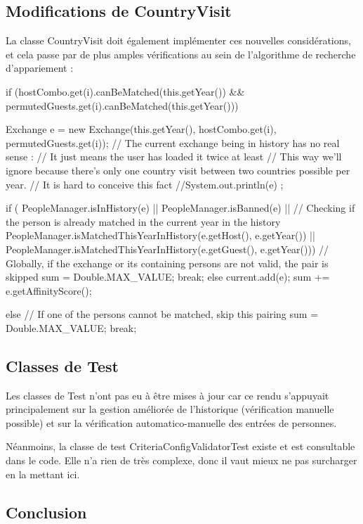 \documentclass{mytex}
\begin{document}
\subsection{Modifications de CountryVisit}

La classe CountryVisit doit également implémenter ces nouvelles considérations, et cela passe par de plus amples vérifications au sein de l'algorithme de recherche d'appariement :

\begin{codebox}
if (hostCombo.get(i).canBeMatched(this.getYear()) && permutedGuests.get(i).canBeMatched(this.getYear())) {
	Exchange e = new Exchange(this.getYear(), hostCombo.get(i), permutedGuests.get(i));
	// The current exchange being in history has no real sense :
	// It just means the user has loaded it twice at least
	// This way we'll ignore because there's only one country visit between two countries possible per year.
	// It is hard to conceive this fact
	//System.out.println(e) ;
	
	if (
	PeopleManager.isInHistory(e) || 
	PeopleManager.isBanned(e) || 
	// Checking if the person is already matched in the current year in the history
	PeopleManager.isMatchedThisYearInHistory(e.getHost(), e.getYear()) ||
	PeopleManager.isMatchedThisYearInHistory(e.getGuest(), e.getYear())) {
		// Globally, if the exchange or its containing persons are not valid, the pair is skipped
		sum = Double.MAX_VALUE;
		break;
	} else {
		current.add(e);
	}
	sum += e.getAffinityScore();
	
} else {
	// If one of the persons cannot be matched, skip this pairing
	sum = Double.MAX_VALUE;
	break;
}
\end{codebox}

\subsection{Classes de Test}

Les classes de Test n'ont pas eu à être mises à jour car ce rendu s'appuyait principalement sur la gestion améliorée de l'historique (vérification manuelle possible) et sur la vérification automatico-manuelle des entrées de personnes.

Néanmoins, la classe de test CriteriaConfigValidatorTest existe et est consultable dans le code. Elle n'a rien de très complexe, donc il vaut mieux ne pas surcharger en la mettant ici. 

\subsection{Conclusion}
\end{document}
